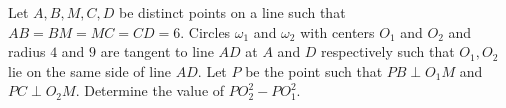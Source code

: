 Let $A,B,M,C,D$ be distinct points on a line such that $AB=BM=MC=CD=6.$ Circles $\omega_1$ and $\omega_2$ with centers $O_1$ and $O_2$ and radius $4$ and $9$ are tangent to line $AD$ at $A$ and $D$ respectively such that $O_1,O_2$ lie on the same side of line $AD.$ Let $P$ be the point such that $PB\perp O_1M$ and $PC\perp O_2M.$ Determine the value of $PO_2^2-PO_1^2.$
